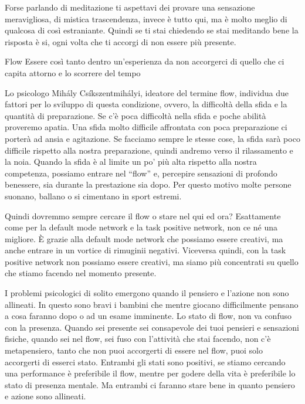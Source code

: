 \documentclass[12pt]{book} %
\begin{document}
Forse parlando di meditazione ti aspettavi dei provare una sensazione meravigliosa, di mistica trascendenza, invece è
tutto qui, ma è molto meglio di qualcosa di così estraniante. Quindi se ti stai chiedendo se stai meditando bene la
risposta è si, ogni volta che ti accorgi di non essere più presente.

\begin{mdframed}[linewidth=1pt]
Flow
Essere così tanto dentro un'esperienza da non accorgerci di quello che ci capita attorno e lo scorrere del tempo

Lo psicologo Mihály Csíkszentmihályi, ideatore del termine flow, individua due fattori per lo sviluppo di questa
condizione, ovvero, la difficoltà della sfida e la quantità di preparazione. Se c'è poca
difficoltà nella sfida e poche abilità proveremo apatia. Una sfida molto difficile affrontata con poca preparazione ci
porterà ad ansia e agitazione. Se facciamo sempre le stesse cose, la sfida sarà poco difficile rispetto alla nostra
preparazione, quindi andremo verso il rilassamento e la noia. Quando la sfida è al limite un po'
più alta rispetto alla nostra competenza, possiamo entrare nel “flow” e, percepire sensazioni di profondo benessere,
sia durante la prestazione sia dopo. Per questo motivo molte persone suonano, ballano o si cimentano in sport estremi.

Quindi dovremmo sempre cercare il flow o stare nel qui ed ora? 
Esattamente come per la default mode network e la task positive network, non ce né una
migliore. È grazie alla default mode network che possiamo essere creativi, ma anche entrare in un vortice di rimuginii
negativi. Viceversa quindi, con la task positive network non possiamo essere creativi, ma siamo più concentrati su
quello che stiamo facendo nel momento presente.

I problemi psicologici di solito emergono quando il pensiero e l'azione non sono allineati. In questo sono bravi i bambini che mentre giocano difficilmente pensano a cosa faranno dopo o ad un esame imminente. Lo stato di flow, non va confuso con la presenza. Quando sei presente sei consapevole dei tuoi pensieri e sensazioni fisiche, quando sei nel flow, sei fuso con l'attività che stai facendo, non c'è metapensiero, tanto che non puoi accorgerti di essere nel flow, puoi solo accorgerti di esserci stato. Entrambi gli stati sono positivi, se stiamo cercando una performance è preferibile il flow, mentre per godere della vita è preferibile lo stato di presenza mentale. Ma entrambi ci faranno stare bene in quanto pensiero e azione sono allineati.
\end{mdframed}
\end{document}
